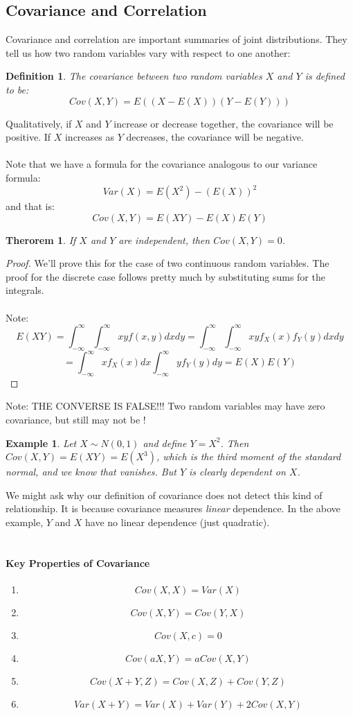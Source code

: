 \documentclass[12pt]{article} %
\newcommand{\infi}{\int_{-\infty}^\infty}
\newtheorem{defn}{Definition}
\newtheorem{example}{Example}
\newtheorem{thm}{Therorem}
\begin{document}
\subsection{Covariance and Correlation}
Covariance and correlation are important summaries of joint distributions. They tell us how two random variables vary with respect to one another:
\begin{defn}
The covariance between two random variables $X$ and $Y$ is defined to be:
$$Cov(X,Y) = E\left(\left(X-E(X)\right)\left(Y-E(Y)\right)\right)$$
\end{defn}
Qualitatively, if $X$ and $Y$ increase or decrease together, the covariance will be positive. If $X$ increases as $Y$ decreases, the covariance will be negative.\\\\
Note that we have a formula for the covariance analogous to our variance formula:
$$Var(X) = E(X^2) - \left(E(X)\right)^2$$
and that is:
$$Cov(X,Y) = E(XY)- E(X)E(Y)$$
\begin{thm}
If $X$ and $Y$ are independent, then $Cov(X,Y) = 0$.
\end{thm} 
\begin{proof}
We'll prove this for the case of two continuous random variables. The proof for the discrete case follows pretty much by substituting sums for the integrals. \\\\
Note:
$$E(XY) = \infi\infi xy f(x,y) dx dy = \infi\infi xy f_X(x)f_Y(y)dxdy$$
$$ = \infi xf_X(x)dx\infi y f_Y(y)dy = E(X)E(Y)$$
\end{proof}
Note: THE CONVERSE IS FALSE!!! Two random variables may have zero covariance, but still may not be !\\
\begin{example}
Let $X\sim N(0,1)$ and define $Y=X^2$. Then $Cov(X,Y) = E(XY) = E(X^3)$, which is the third moment of the standard normal, and we know that vanishes. But $Y$ is \emph{clearly} dependent on $X$.
\end{example}
We might ask why our definition of covariance does not detect this kind of relationship. It is because covariance measures \emph{linear} dependence. In the above example, $Y$ and $X$ have no linear dependence (just quadratic).\\\\
\paragraph{Key Properties of Covariance}
\begin{enumerate}
\item $$Cov(X,X) = Var(X)$$
\item $$Cov(X,Y) = Cov(Y,X)$$
\item $$Cov(X,c) = 0$$
\item $$Cov(aX,Y) = aCov(X,Y)$$
\item $$Cov(X+Y,Z) = Cov(X,Z) + Cov(Y,Z)$$
\item $$Var(X+Y) = Var(X)+Var(Y) + 2Cov(X,Y)$$
\end{enumerate}
\end{document}
